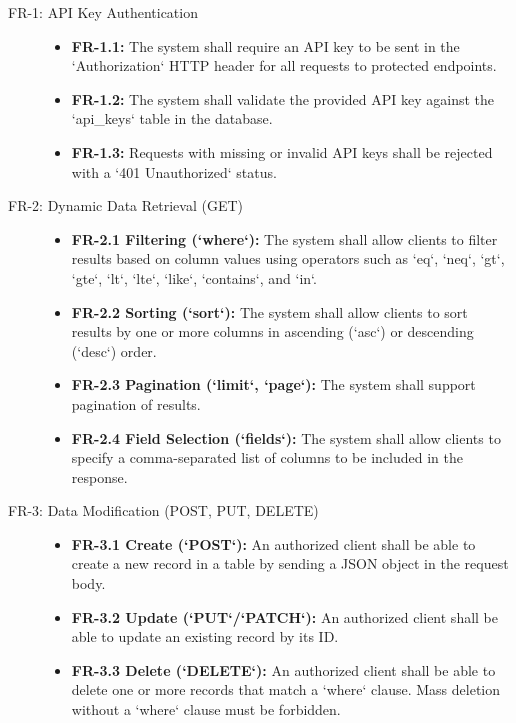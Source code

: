 \documentclass[12pt, a4paper]{report}
\begin{document}
\begin{description}
    \item[FR-1: API Key Authentication]
        \begin{itemize}
            \item \textbf{FR-1.1:} The system shall require an API key to be sent in the `Authorization` HTTP header for all requests to protected endpoints.
            \item \textbf{FR-1.2:} The system shall validate the provided API key against the `api_keys` table in the database.
            \item \textbf{FR-1.3:} Requests with missing or invalid API keys shall be rejected with a `401 Unauthorized` status.
        \end{itemize}
    \item[FR-2: Dynamic Data Retrieval (GET)]
        \begin{itemize}
            \item \textbf{FR-2.1 Filtering (`where`):} The system shall allow clients to filter results based on column values using operators such as `eq`, `neq`, `gt`, `gte`, `lt`, `lte`, `like`, `contains`, and `in`.
            \item \textbf{FR-2.2 Sorting (`sort`):} The system shall allow clients to sort results by one or more columns in ascending (`asc`) or descending (`desc`) order.
            \item \textbf{FR-2.3 Pagination (`limit`, `page`):} The system shall support pagination of results.
            \item \textbf{FR-2.4 Field Selection (`fields`):} The system shall allow clients to specify a comma-separated list of columns to be included in the response.
        \end{itemize}
    \item[FR-3: Data Modification (POST, PUT, DELETE)]
        \begin{itemize}
            \item \textbf{FR-3.1 Create (`POST`):} An authorized client shall be able to create a new record in a table by sending a JSON object in the request body.
            \item \textbf{FR-3.2 Update (`PUT`/`PATCH`):} An authorized client shall be able to update an existing record by its ID.
            \item \textbf{FR-3.3 Delete (`DELETE`):} An authorized client shall be able to delete one or more records that match a `where` clause. Mass deletion without a `where` clause must be forbidden.

\end{itemize}
\end{description}
\end{document}
